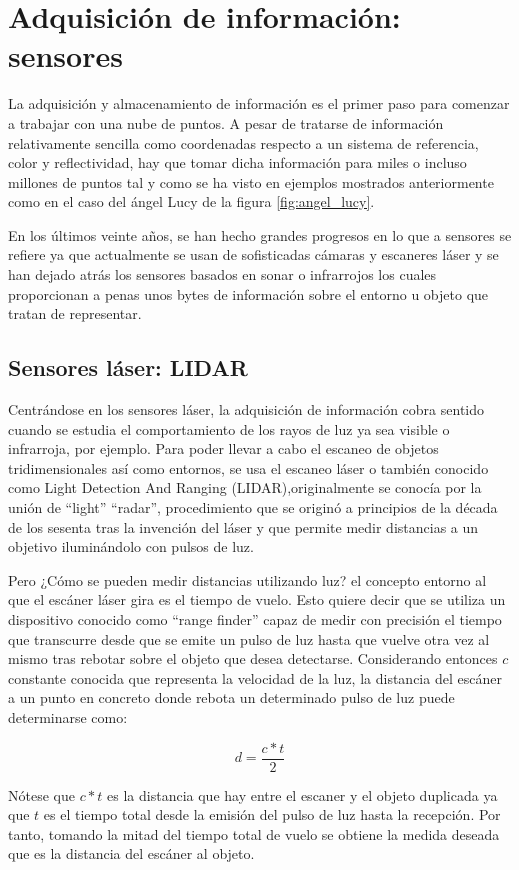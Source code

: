 \section{Adquisición de información: sensores}
La adquisición y almacenamiento de información es el primer paso para comenzar a trabajar con una nube de puntos. A pesar de tratarse de información relativamente sencilla como coordenadas respecto a un sistema de referencia, color y reflectividad, hay que tomar dicha información para miles o incluso millones de puntos tal y como se ha visto en ejemplos mostrados anteriormente como en el caso del ángel Lucy de la figura \ref{fig:angel_lucy}. 

En los últimos veinte años, se han hecho grandes progresos en lo que a sensores se refiere ya que actualmente se usan de sofisticadas cámaras y escaneres láser y se han dejado atrás los sensores basados en sonar o infrarrojos los cuales proporcionan a penas unos bytes de información sobre el entorno u objeto que tratan de representar.

\subsection{Sensores láser: LIDAR}
Centrándose en los sensores láser, la adquisición de información cobra sentido cuando se estudia el comportamiento de los rayos de luz ya sea visible o infrarroja, por ejemplo. Para poder llevar a cabo el escaneo de objetos tridimensionales así como entornos, se usa el escaneo láser o también conocido como Light Detection And Ranging (LIDAR),originalmente se conocía por la unión de ``light'' ``radar'', 
procedimiento que se originó a principios de la década de los sesenta tras la invención del láser y que permite medir distancias a un objetivo iluminándolo con pulsos de luz.

Pero ¿Cómo se pueden medir distancias utilizando luz?\cite{lidar} el concepto entorno al que el escáner láser gira es el tiempo de vuelo. Esto quiere decir que se utiliza un dispositivo conocido como ``range finder'' capaz de medir con precisión el tiempo que transcurre desde que se emite un pulso de luz hasta que vuelve otra vez al mismo tras rebotar sobre el objeto que desea detectarse. Considerando entonces $c$ constante conocida que representa la velocidad de la luz, la distancia del escáner a un punto en concreto donde rebota un determinado pulso de luz puede determinarse como:

$$d = \frac{c*t}{2}$$

Nótese que $c*t$ es la distancia que hay entre el escaner y el objeto duplicada ya que $t$ es el tiempo total desde la emisión del pulso de luz hasta la recepción. Por tanto, tomando la mitad del tiempo total de vuelo se obtiene la medida deseada que es la distancia del escáner al objeto.

